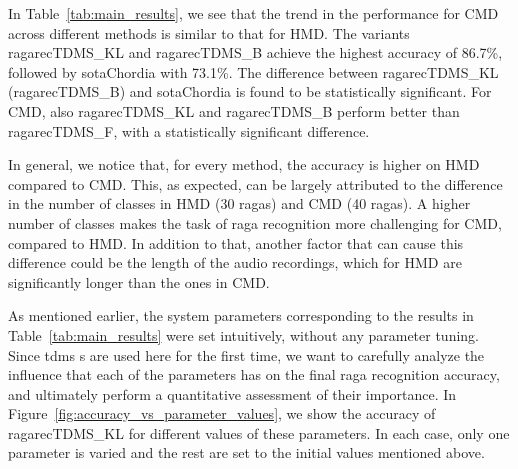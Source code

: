 In Table~\ref{tab:main_results}, we see that the trend in the performance for  CMD across different methods is similar to that for  HMD. The variants \acrshort{ragarecTDMS_KL} and \acrshort{ragarecTDMS_B} achieve the highest accuracy of 86.7\%, followed by \acrshort{sotaChordia} with 73.1\%. The difference between \acrshort{ragarecTDMS_KL} (\acrshort{ragarecTDMS_B}) and \acrshort{sotaChordia} is found to be statistically significant.  For CMD, also  \acrshort{ragarecTDMS_KL} and \acrshort{ragarecTDMS_B} perform better than \acrshort{ragarecTDMS_F}, with a statistically significant difference. 

In general, we notice that, for every method, the accuracy is higher on HMD compared to CMD. This, as expected, can be largely attributed to the difference in the number of classes in  HMD (30 \glspl{raga}) and  CMD (40 \glspl{raga}). A higher number of classes makes the task of \gls{raga} recognition more challenging for  CMD, compared to  HMD. In addition to that, another factor that can cause this difference could be the length of the audio recordings, which for  HMD are significantly longer than the ones in CMD.

As mentioned earlier, the system parameters corresponding to the results in Table~\ref{tab:main_results} were set intuitively, without any parameter tuning. Since \gls{tdms} s are used here for the first time, we want to carefully analyze the influence that each of the parameters has on the final \gls{raga} recognition accuracy, and ultimately perform a quantitative assessment of their importance. In Figure~\ref{fig:accuracy_vs_parameter_values}, we show the accuracy of \acrshort{ragarecTDMS_KL} for different values of these parameters. In each case, only one parameter is varied and the rest are set to the initial values mentioned above. 

